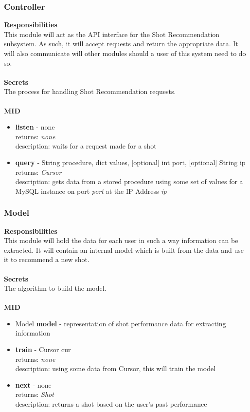 \documentclass[11pt]{article}
\begin{document}
\subsubsection*{Controller}
\textbf{Responsibilities} \\
This module will act as the API interface for the Shot Recommendation subsystem. As such, it will accept requests and return the appropriate data. It will also communicate will other modules should a user of this system need to do so. \\ \\
\textbf{Secrets} \\
The process for handling Shot Recommendation requests. \\ \\
\textbf{MID}
\begin{itemize}
\item \textbf{listen} - none \\ returns: \textit{none} \\ description: waits for a request made for a shot
\item \textbf{query} - String procedure,  dict values, [optional] int port, [optional] String ip \\ returns: \textit{Cursor} \\ description: gets data from a stored procedure using some set of values for a MySQL instance on port \textit{port} at the IP Address \textit{ip}
\end{itemize}

\subsubsection*{Model}
\textbf{Responsibilities} \\
This module will hold the data for each user in such a way information can be extracted. It will contain an internal model which is built from the data and use it to recommend a new shot. \\ \\
\textbf{Secrets} \\ 
The algorithm to build the model. \\ \\
\textbf{MID}
\begin{itemize}
\item Model \textbf{model} - representation of shot performance data for extracting information
\item \textbf{train} - Cursor cur \\ returns: \textit{none} \\ description: using some data from Cursor, this will train the model
\item \textbf{next} - none \\ returns: \textit{Shot} \\ description: returns a shot based on the user's past performance
\end{itemize}
\end{document}
